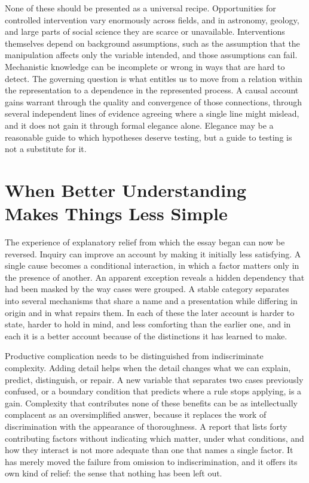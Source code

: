 \documentclass[11pt,letterpaper]{article}
\theoremstyle{definition}
\begin{document}
None of these should be presented as a universal recipe. Opportunities for controlled intervention vary enormously across fields, and in astronomy, geology, and large parts of social science they are scarce or unavailable. Interventions themselves depend on background assumptions, such as the assumption that the manipulation affects only the variable intended, and those assumptions can fail. Mechanistic knowledge can be incomplete or wrong in ways that are hard to detect. The governing question is what entitles us to move from a relation within the representation to a dependence in the represented process. A causal account gains warrant through the quality and convergence of those connections, through several independent lines of evidence agreeing where a single line might mislead, and it does not gain it through formal elegance alone. Elegance may be a reasonable guide to which hypotheses deserve testing, but a guide to testing is not a substitute for it.

\section{When Better Understanding Makes Things Less Simple}

The experience of explanatory relief from which the essay began can now be reversed. Inquiry can improve an account by making it initially less satisfying. A single cause becomes a conditional interaction, in which a factor matters only in the presence of another. An apparent exception reveals a hidden dependency that had been masked by the way cases were grouped. A stable category separates into several mechanisms that share a name and a presentation while differing in origin and in what repairs them. In each of these the later account is harder to state, harder to hold in mind, and less comforting than the earlier one, and in each it is a better account because of the distinctions it has learned to make.

Productive complication needs to be distinguished from indiscriminate complexity. Adding detail helps when the detail changes what we can explain, predict, distinguish, or repair. A new variable that separates two cases previously confused, or a boundary condition that predicts where a rule stops applying, is a gain. Complexity that contributes none of these benefits can be as intellectually complacent as an oversimplified answer, because it replaces the work of discrimination with the appearance of thoroughness. A report that lists forty contributing factors without indicating which matter, under what conditions, and how they interact is not more adequate than one that names a single factor. It has merely moved the failure from omission to indiscrimination, and it offers its own kind of relief: the sense that nothing has been left out.
\end{document}
